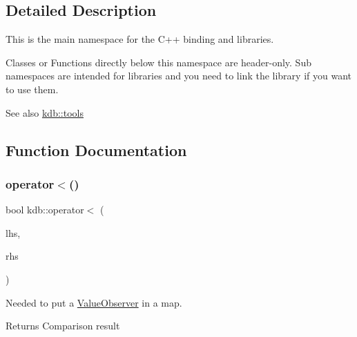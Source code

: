 \subsection{Detailed Description}
This is the main namespace for the C++ binding and libraries. 

Classes or Functions directly below this namespace are header-\/only. Sub namespaces are intended for libraries and you need to link the library if you want to use them.
\begin{DoxyItemize}
\item \begin{DoxySeeAlso}{See also}
\hyperlink{namespacekdb_1_1tools}{kdb\+::tools} 
\end{DoxySeeAlso}

\end{DoxyItemize}

\subsection{Function Documentation}
\mbox{\label{namespacekdb_a53a162c7ff73150a3f6e6ab9d191aab0}} 
\subsubsection{\texorpdfstring{operator$<$()}{operator<()}}
{\footnotesize\ttfamily bool kdb\+::operator$<$ (\begin{DoxyParamCaption}\item[{\hyperlink{classkdb_1_1ValueObserver}{Value\+Observer} const \&}]{lhs,  }\item[{\hyperlink{classkdb_1_1ValueObserver}{Value\+Observer} const \&}]{rhs }\end{DoxyParamCaption})\hspace{0.3cm}{\ttfamily [inline]}}



Needed to put a \hyperlink{classkdb_1_1ValueObserver}{Value\+Observer} in a map. 

\begin{DoxyReturn}{Returns}
Comparison result 
\end{DoxyReturn}
\mbox{\label{namespacekdb_ac004b5ba79154cbba02d5e5d83337e47}} 
